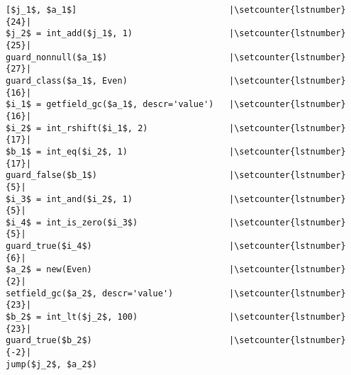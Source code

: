 \begin{lstlisting}[mathescape, numbers=right, escapechar=|, firstnumber=-1]
[$j_1$, $a_1$]                              |\setcounter{lstnumber}{24}|
$j_2$ = int_add($j_1$, 1)                   |\setcounter{lstnumber}{25}|
guard_nonnull($a_1$)                        |\setcounter{lstnumber}{27}|
guard_class($a_1$, Even)                    |\setcounter{lstnumber}{16}|
$i_1$ = getfield_gc($a_1$, descr='value')   |\setcounter{lstnumber}{16}|
$i_2$ = int_rshift($i_1$, 2)                |\setcounter{lstnumber}{17}|
$b_1$ = int_eq($i_2$, 1)                    |\setcounter{lstnumber}{17}|
guard_false($b_1$)                          |\setcounter{lstnumber}{5}|
$i_3$ = int_and($i_2$, 1)                   |\setcounter{lstnumber}{5}|
$i_4$ = int_is_zero($i_3$)                  |\setcounter{lstnumber}{5}|
guard_true($i_4$)                           |\setcounter{lstnumber}{6}|
$a_2$ = new(Even)                           |\setcounter{lstnumber}{2}|
setfield_gc($a_2$, descr='value')           |\setcounter{lstnumber}{23}|
$b_2$ = int_lt($j_2$, 100)                  |\setcounter{lstnumber}{23}|
guard_true($b_2$)                           |\setcounter{lstnumber}{-2}|
jump($j_2$, $a_2$)
\end{lstlisting}

